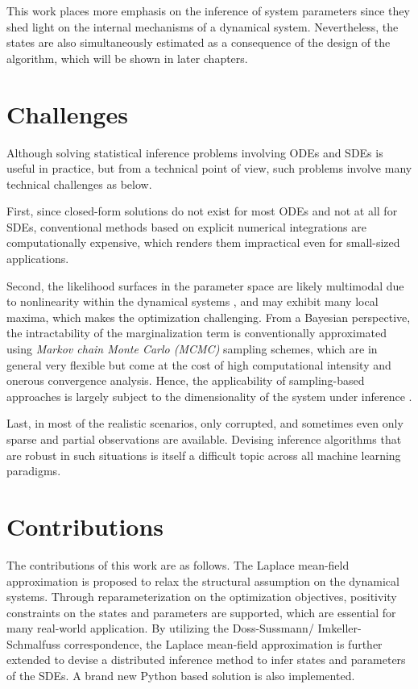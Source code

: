 This work places more emphasis on the inference of system parameters since they shed light on the internal mechanisms of a dynamical system. 
Nevertheless, the states are also simultaneously estimated as a consequence of the design of the algorithm, which will be shown in later chapters.

\section{Challenges}
\label{sec-challenges}

Although solving statistical inference problems involving ODEs and SDEs is useful in practice, but from a technical point of view, such problems involve many technical challenges as below.

First, since closed-form solutions do not exist for most ODEs and not at all for SDEs, conventional methods based on explicit numerical integrations are computationally expensive, which renders them impractical even for small-sized applications.

Second, the likelihood surfaces in the parameter space are likely multimodal due to nonlinearity within the dynamical systems \citep{calderhead2009accelerating}, and may exhibit many local maxima, which makes the optimization challenging.
From a Bayesian perspective, the intractability of the marginalization term is conventionally approximated using \emph{Markov chain Monte Carlo (MCMC)} sampling schemes, which are in general very flexible but come at the cost of high computational intensity and onerous convergence analysis.
Hence, the applicability of sampling-based approaches is largely subject to the dimensionality of the system under inference \citep{vrettas2015variational}. 

Last, in most of the realistic scenarios, only corrupted, and sometimes even only sparse and partial observations are available.
Devising inference algorithms that are robust in such situations is itself a difficult topic across all machine learning paradigms.

\section{Contributions}
The contributions of this work are as follows. 
The Laplace mean-field approximation is proposed to relax the structural assumption on the dynamical systems.
Through reparameterization on the optimization objectives, positivity constraints on the states and parameters are supported, which are essential for many real-world application.
By utilizing the Doss-Sussmann/ Imkeller-Schmalfuss correspondence, the Laplace mean-field approximation is further extended to devise a distributed inference method to infer states and parameters of the SDEs.
A brand new Python based solution is also implemented.

